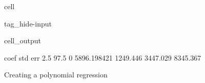 \documentclass[letterpaper,10pt,english]{jupyterBook}
\begin{document}
\begin{sphinxuseclass}{cell}
\begin{sphinxuseclass}{tag_hide-input}\begin{sphinxVerbatimOutput}

\begin{sphinxuseclass}{cell_output}
\begin{sphinxVerbatim}[commandchars=\\\{\}]
          coef    std err      2.5 \PYGZpc{}     97.5 \PYGZpc{}
0  5896.198421   1249.446   3447.029   8345.367
\end{sphinxVerbatim}

\end{sphinxuseclass}\end{sphinxVerbatimOutput}

\end{sphinxuseclass}
\end{sphinxuseclass}
\sphinxAtStartPar
Creating a polynomial regression
\end{document}
